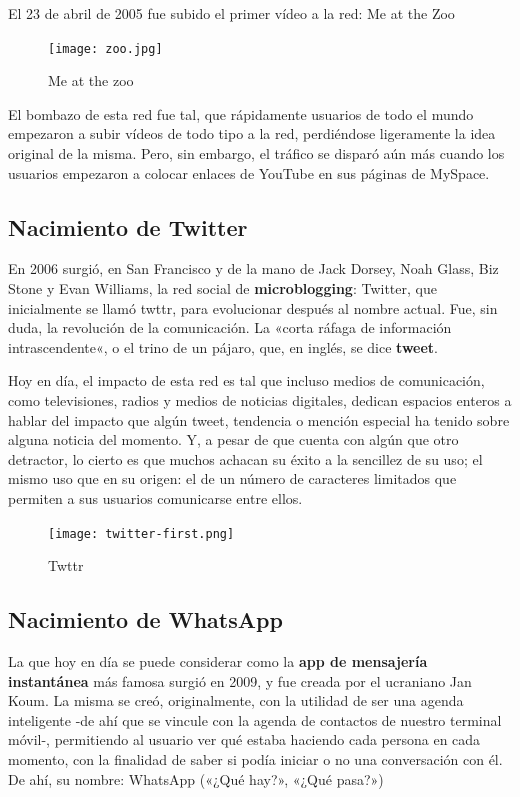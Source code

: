 El 23 de abril de 2005 fue subido el primer vídeo a la red: Me at the Zoo

\begin{figure}[ht!]
    \texttt{[image: zoo.jpg]}
    \caption{Me at the zoo}
    \label{zoo}
\end{figure}

El bombazo de esta red fue tal, que rápidamente usuarios de todo el mundo empezaron a subir vídeos de todo tipo a la red, perdiéndose ligeramente la idea original de la misma. Pero, sin embargo, el tráfico se disparó aún más cuando los usuarios empezaron a colocar enlaces de YouTube en sus páginas de MySpace.

\subsection{Nacimiento de Twitter}

En 2006 surgió, en San Francisco y de la mano de Jack Dorsey, Noah Glass, Biz Stone y Evan Williams, la red social de \textbf{microblogging}: Twitter, que inicialmente se llamó twttr, para evolucionar después al nombre actual. Fue, sin duda, la revolución de la comunicación. La «corta ráfaga de información intrascendente«, o el trino de un pájaro, que, en inglés, se dice \textbf{tweet}.

Hoy en día, el impacto de esta red es tal que incluso medios de comunicación, como televisiones, radios y medios de noticias digitales, dedican espacios enteros a hablar del impacto que algún tweet, tendencia o mención especial ha tenido sobre alguna noticia del momento. Y, a pesar de que cuenta con algún que otro detractor, lo cierto es que muchos achacan su éxito a la sencillez de su uso; el mismo uso que en su origen: el de un número de caracteres limitados que permiten a sus usuarios comunicarse entre ellos.

\begin{figure}[ht!]
    \texttt{[image: twitter-first.png]}
    \caption{Twttr}
    \label{twttr}
\end{figure}

\subsection{Nacimiento de WhatsApp}

La que hoy en día se puede considerar como la \textbf{app de mensajería instantánea} más famosa surgió en 2009, y fue creada por el ucraniano Jan Koum. La misma se creó, originalmente, con la utilidad de ser una agenda inteligente -de ahí que se vincule con la agenda de contactos de nuestro terminal móvil-, permitiendo al usuario ver qué estaba haciendo cada persona en cada momento, con la finalidad de saber si podía iniciar o no una conversación con él. De ahí, su nombre: WhatsApp («¿Qué hay?», «¿Qué pasa?»)

